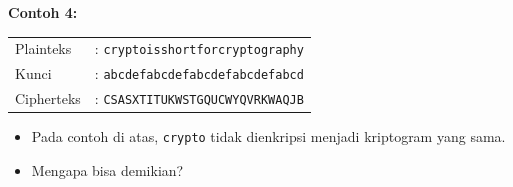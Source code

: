 \documentclass{article}
\begin{document}

\textbf{Contoh 4:}

\begin{tabular}{ll}
Plainteks & : \texttt{cryptoisshortforcryptography} \\
Kunci & : \texttt{abcdefabcdefabcdefabcdefabcd} \\
Cipherteks & : \texttt{CSASXTITUKWSTGQUCWYQVRKWAQJB} \\
\end{tabular}

\begin{itemize}
    \item Pada contoh di atas, \texttt{crypto} tidak dienkripsi menjadi kriptogram yang sama. 
    \item Mengapa bisa demikian?
\end{itemize}
\end{document}
